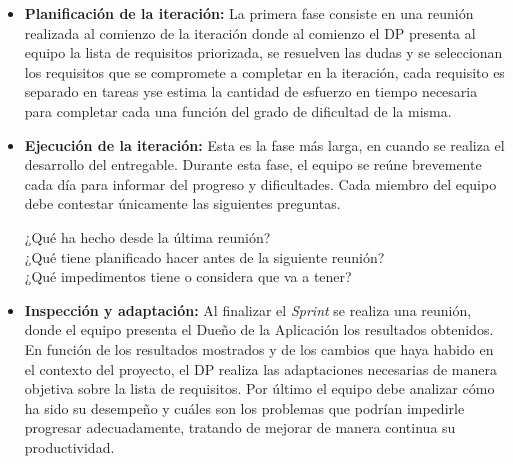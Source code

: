 \begin{itemize}
\item \textbf{Planificación de la iteración:} La primera fase consiste en una reunión realizada al comienzo de la iteración donde al comienzo el DP presenta al equipo la lista de requisitos priorizada, se resuelven las dudas y se seleccionan los requisitos que se compromete a completar en la iteración, cada requisito es separado en tareas  yse estima la cantidad de esfuerzo en tiempo necesaria para completar cada una función del grado de dificultad de la misma.

\item \textbf{Ejecución de la iteración:} Esta es la fase más larga, en cuando se realiza el desarrollo del entregable. Durante esta fase, el equipo se reúne brevemente cada día para informar del progreso y dificultades. Cada miembro del equipo debe contestar únicamente las siguientes preguntas.

¿Qué ha hecho desde la última reunión?\\
¿Qué tiene planificado hacer antes de la siguiente reunión?\\
¿Qué impedimentos tiene o considera que va a tener?


\item \textbf{Inspección y adaptación:} Al finalizar el \textit{Sprint} se realiza una reunión, donde el equipo presenta el Dueño de la Aplicación los resultados obtenidos. En función de los resultados mostrados y de los cambios que haya habido en el contexto del proyecto, el DP realiza las adaptaciones necesarias de manera objetiva sobre la lista de requisitos. Por último el equipo debe analizar cómo ha sido su desempeño y cuáles son los problemas que podrían impedirle progresar adecuadamente, tratando de mejorar de manera continua su productividad.

\end{itemize}








 
